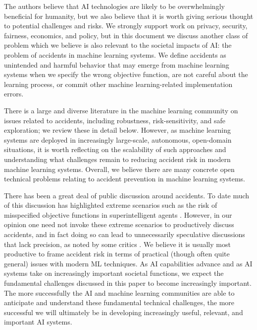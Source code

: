 \documentclass[a4paper,10pt]{article}
\begin{document}
The authors believe that AI technologies are likely to be overwhelmingly beneficial for humanity, but we also believe that it is worth giving serious thought to potential challenges and risks.  We strongly support work on privacy, security, fairness, economics, and policy, but in this document we discuss another class of problem which we believe is also relevant to the societal impacts of AI: the problem of accidents in machine learning systems.  We define accidents as unintended and harmful behavior that may emerge from machine learning systems when we specify the wrong objective function, are not careful about the learning process, or commit other machine learning-related implementation errors.

There is a large and diverse literature in the machine learning community on issues related to accidents, including robustness, risk-sensitivity, and safe exploration; we review these in detail below. However, as machine learning systems are deployed in increasingly large-scale, autonomous, open-domain situations, it is worth reflecting on the scalability of such approaches and understanding what challenges remain to reducing accident risk in modern machine learning systems. Overall, we believe there are many concrete open technical problems relating to accident prevention in machine learning systems.

There has been a great deal of public discussion around accidents.  To date much of this discussion has highlighted extreme scenarios such as the risk of misspecified objective functions in superintelligent agents \cite{bostrom2014superintelligence}.  However, in our opinion one need not invoke these extreme scenarios to productively discuss accidents, and in fact doing so can lead to unnecessarily speculative discussions that lack precision, as noted by some critics \cite{davis2015ethical,lawrence2016discussion}.  We believe it is usually most productive to frame accident risk in terms of practical (though often quite general) issues with modern ML techniques.  As AI capabilities advance and as AI systems take on increasingly important societal functions, we expect the fundamental challenges discussed in this paper to become increasingly important.  The more successfully the AI and machine learning communities are able to anticipate and understand these fundamental technical challenges, the more successful we will ultimately be in developing increasingly useful, relevant, and important AI systems.
\end{document}
